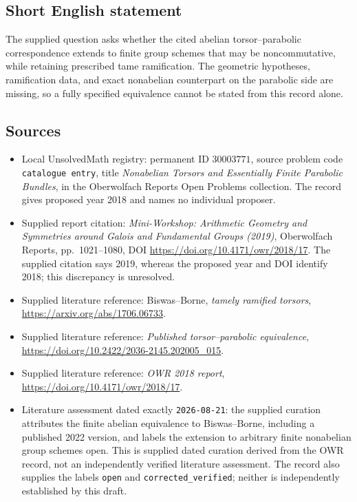 \documentclass[11pt]{article}
\begin{document}
\subsection{Short English statement}
The supplied question asks whether the cited abelian torsor--parabolic correspondence extends to finite group schemes that may be noncommutative, while retaining prescribed tame ramification. The geometric hypotheses, ramification data, and exact nonabelian counterpart on the parabolic side are missing, so a fully specified equivalence cannot be stated from this record alone.
\subsection{Sources}
\begin{itemize}
\item Local UnsolvedMath registry: permanent ID \(30003771\), source problem code \texttt{catalogue entry}, title \emph{Nonabelian Torsors and Essentially Finite Parabolic Bundles}, in the Oberwolfach Reports Open Problems collection. The record gives proposed year 2018 and names no individual proposer.
\item Supplied report citation: \emph{Mini-Workshop: Arithmetic Geometry and Symmetries around Galois and Fundamental Groups (2019)}, Oberwolfach Reports, pp.~1021--1080, DOI \url{https://doi.org/10.4171/owr/2018/17}. The supplied citation says 2019, whereas the proposed year and DOI identify 2018; this discrepancy is unresolved.
\item Supplied literature reference: Biswas--Borne, \emph{tamely ramified torsors}, \url{https://arxiv.org/abs/1706.06733}.
\item Supplied literature reference: \emph{Published torsor--parabolic equivalence}, \url{https://doi.org/10.2422/2036-2145.202005_015}.
\item Supplied literature reference: \emph{OWR 2018 report}, \url{https://doi.org/10.4171/owr/2018/17}.
\item Literature assessment dated exactly \texttt{2026-08-21}: the supplied curation attributes the finite abelian equivalence to Biswas--Borne, including a published 2022 version, and labels the extension to arbitrary finite nonabelian group schemes open. This is supplied dated curation derived from the OWR record, not an independently verified literature assessment. The record also supplies the labels \texttt{open} and \texttt{corrected\_verified}; neither is independently established by this draft.
\end{itemize}
\end{document}
